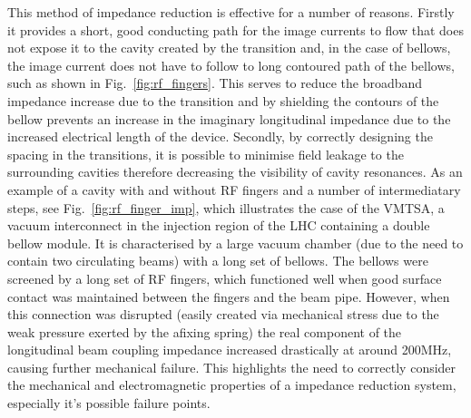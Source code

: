 This method of impedance reduction is effective for a number of reasons. Firstly it provides a short, good conducting path for the image currents to flow that does not expose it to the cavity created by the transition and, in the case of bellows, the image current does not have to follow to long contoured path of the bellows, such as shown in Fig.~\ref{fig:rf_fingers}. This serves to reduce the broadband impedance increase due to the transition and by shielding the contours of the bellow prevents an increase in the imaginary longitudinal impedance due to the increased electrical length of the device. Secondly, by correctly designing the spacing in the transitions, it is possible to minimise field leakage to the surrounding cavities therefore decreasing the visibility of cavity resonances. As an example of a cavity with and without RF fingers and a number of intermediatary steps, see Fig.~\ref{fig:rf_finger_imp}, which illustrates the case of the VMTSA, a vacuum interconnect in the injection region of the LHC \cite{Salvant:VMTSA} containing a double bellow module. It is characterised by a large vacuum chamber (due to the need to contain two circulating beams) with a long set of bellows. The bellows were screened by a long set of RF fingers, which functioned well when good surface contact was maintained between the fingers and the beam pipe. However, when this connection was disrupted (easily created via mechanical stress due to the weak pressure exerted by the afixing spring) the real component of the longitudinal beam coupling impedance increased drastically at around 200MHz, causing further mechanical failure. This highlights the need to correctly consider the mechanical and electromagnetic properties of a impedance reduction system, especially it's possible failure points.


